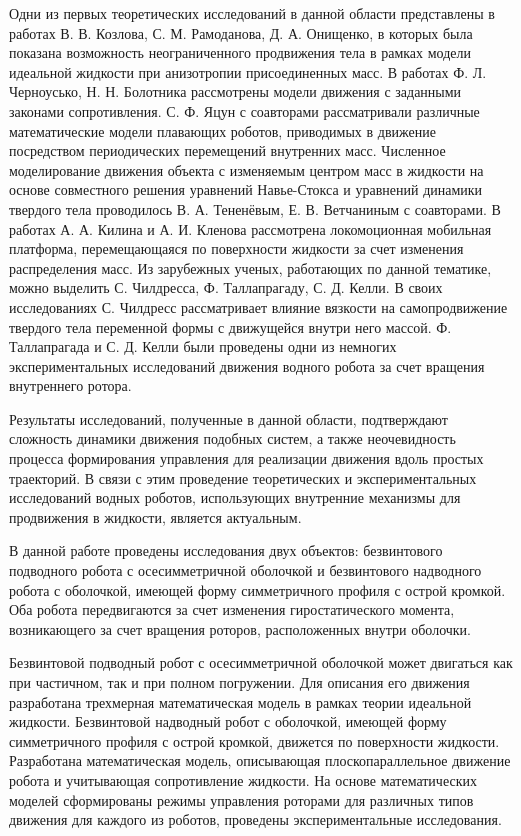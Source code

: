 Одни из первых теоретических исследований в данной области представлены в работах В. В. Козлова, С. М. Рамоданова, Д. А. Онищенко, в которых была показана возможность неограниченного продвижения тела в рамках модели идеальной жидкости при анизотропии присоединенных масс. В работах Ф. Л. Черноусько, Н. Н. Болотника рассмотрены модели движения с заданными законами сопротивления. С. Ф. Яцун с соавторами рассматривали различные математические модели плавающих роботов, приводимых в движение посредством периодических перемещений внутренних масс. Численное моделирование движения объекта с изменяемым центром масс в жидкости на основе совместного решения уравнений Навье-Стокса и уравнений динамики твердого тела проводилось В. А. Тененёвым, Е. В. Ветчаниным с соавторами. В работах А. А. Килина и А. И. Кленова рассмотрена локомоционная мобильная платформа, перемещающаяся по поверхности жидкости за счет изменения распределения масс. 
Из зарубежных ученых, работающих по данной тематике, можно выделить С. Чилдресса, Ф. Таллапрагаду, С. Д. Келли. %
В своих исследованиях С. Чилдресс рассматривает влияние вязкости на самопродвижение твердого тела переменной формы с движущейся внутри него массой. Ф. Таллапрагада и С. Д. Келли были проведены одни из немногих экспериментальных исследований движения водного робота за счет вращения внутреннего ротора.  %

Результаты исследований, полученные в данной области, подтверждают сложность динамики движения подобных систем, а также неочевидность процесса формирования управления для реализации движения вдоль простых траекторий. В связи с этим проведение теоретических и экспериментальных исследований водных роботов, использующих внутренние механизмы для продвижения в жидкости, является актуальным.

В данной работе проведены исследования двух объектов: безвинтового подводного робота с осесимметричной оболочкой и безвинтового надводного робота с оболочкой, имеющей форму симметричного профиля с острой кромкой. Оба робота передвигаются за счет изменения гиростатического момента, возникающего за счет вращения роторов, расположенных внутри оболочки.
 
Безвинтовой подводный робот с осесимметричной оболочкой может двигаться как при частичном, так и при полном погружении. Для описания его движения разработана трехмерная математическая модель в рамках теории идеальной жидкости. Безвинтовой надводный робот с оболочкой, имеющей форму симметричного профиля с острой кромкой, движется по поверхности жидкости. Разработана математическая модель, описывающая плоскопараллельное движение робота и учитывающая сопротивление жидкости. На основе математических моделей сформированы режимы управления роторами для различных типов движения для каждого из роботов, проведены экспериментальные исследования.




